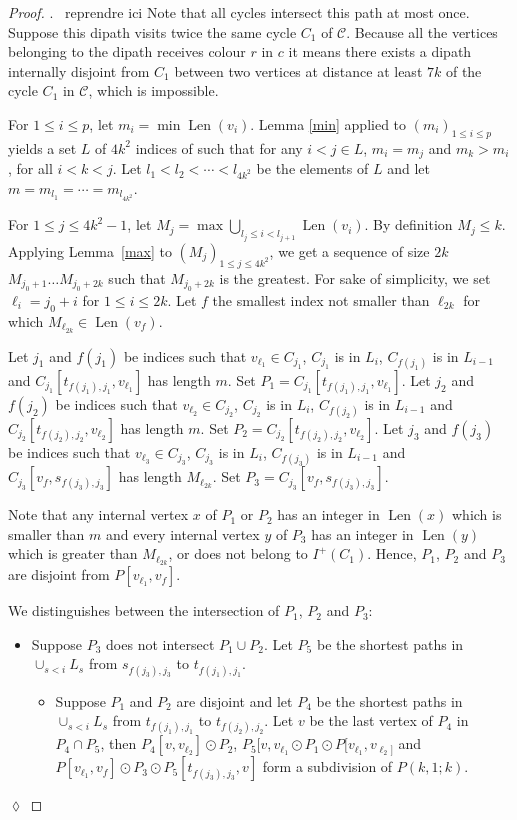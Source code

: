 \documentclass[utf8,10pt]{article}
\theoremstyle{plain}
\theoremstyle{definition}
\theoremstyle{remark}
\newcommand{\FH}[1]{{\color{red}{\bf Fred:} #1}}
\newenvironment{subproof}{\par\noindent {\it Subproof}.\ }{\hfill$\lozenge$\par\vspace{11pt}}
\DeclareMathOperator{\Len}{Len}
\begin{document}
\begin{proof}
\begin{subproof}
\FH{reprendre ici}
Note that all cycles intersect this path at most once.
Suppose this dipath visits twice 
the same cycle $C_1$ of $\mathcal{C}$. Because all the vertices belonging to the dipath receives colour $r$ in $c$ it means there exists a 
dipath internally disjoint from $C_1$ between two vertices at distance at least $7k$ of the cycle $C_1$ in $\mathcal{C}$, which is impossible. 


For $1\leq i\leq p$, let $m_i = \min \Len(v_i)$. 
Lemma \ref{min} applied to $(m_i)_{1\leq i\leq p}$ yields a set $L$ of $4k^2$ indices of such that 
for any $i< j \in L$,  $m_i=m_j$ and $m_k > m_i$, for all $i< k < j$.
Let $l_1 < l_2 < \cdots < l_{4k^2}$ be the elements of $L$ and let $m= m_{l_1} = \cdots = m_{l_{4k^2}}$.


For $1\leq j\leq 4k^2-1$, let $M_j = \max \bigcup_{l_j\leq i < l_{j+1}} \Len(v_i)$.
By definition $M_j\leq k$.
Applying Lemma~\ref{max} to $(M_j)_{1\leq j\leq 4k^2}$,  we get a sequence of size $2k$ $M_{j_0+1} \dots M_{j_0+{2k}}$ such that $M_{j_0+{2k}}$ is the greatest. 
For sake of simplicity, we set $\ell_i =j_0+i$ for $1\leq i\leq 2k$.
Let $f$ the smallest index not smaller than $\ell_{2k}$ for which $M_{\ell_{2k}} \in \Len (v_f)$. 

Let $j_1$ and $f(j_1)$ be indices such that $v_{\ell_1} \in C_{j_1}$, $C_{j_1}$ is in $L_i$, $C_{f(j_1)}$ is in $L_{i-1}$ and 
$C_{j_1}[t_{f(j_1),j_1},v_{\ell_1}]$ has length $m$. Set $P_1=C_{j_1}[t_{f(j_1),j_1},v_{\ell_1}]$.
Let $j_2$ and $f(j_2)$ be indices such that $v_{\ell_2} \in C_{j_2}$, $C_{j_2}$ is in $L_i$, $C_{f(j_2)}$ is in $L_{i-1}$ and 
$C_{j_2}[t_{f(j_2),j_2},v_{\ell_2}]$ has length $m$. Set $P_2=C_{j_2}[t_{f(j_2),j_2},v_{\ell_2}]$.
Let $j_3$ and $f(j_3)$ be indices such that $v_{\ell_3} \in C_{j_3}$, $C_{j_3}$ is in $L_i$, $C_{f(j_3)}$ is in $L_{i-1}$ and 
$C_{j_3}[v_{f},s_{f(j_3),j_3}]$ has length $M_{\ell_{2k}}$. Set $P_3=C_{j_3}[v_{f},s_{f(j_3),j_3}]$.

Note that any internal vertex $x$ of $P_1$ or $P_2$ has an integer in $\Len(x)$
which is smaller than $m$ and every internal vertex $y$ of $P_3$ has an integer in $\Len(y)$ which
is greater than $M_{\ell_{2k}}$, or does not belong to $I^+(C_1)$. Hence, 
$P_1$, $P_2$ and $P_3$ are disjoint from $P[v_{\ell_1},v_f]$. 

We distinguishes between the intersection of $P_1$, $P_2$ and $P_3$:

\begin{itemize}
	\item Suppose $P_3$ does not intersect $P_1 \cup P_2$. Let $P_5$ be the shortest paths in $\cup_{s < i} L_s$ from $s_{f(j_3),j_3}$ to $t_{f(j_1),j_1}$.
	\begin{itemize}
		\item Suppose $P_1$ and $P_2$ are disjoint and let $P_4$ be the shortest paths in $\cup_{s < i} L_s$ 
from $t_{f(j_1),j_1}$ to $t_{f(j_2),j_2}$. Let $v$ be the last vertex of $P_4$ in $P_4 \cap P_5$, then $P_4[v,v_{\ell_2}] \odot P_2$,
$P_5[v, v_{\ell_1} \odot P_1 \odot P[v_{\ell_1}, v_{\ell_2]}$ and $P[v_{\ell_1}, v_f] \odot P_3 \odot P_5[t_{f(j_3),j_3}, v]$
form a subdivision of $P(k,1;k)$.
	

\end{itemize}
\end{itemize}
\end{subproof}
\end{proof}
\end{document}
